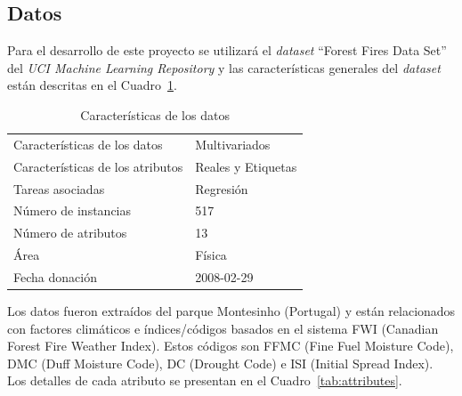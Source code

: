 \documentclass[spanish]{article}
\begin{document}
	\subsection{Datos}
    
  	Para el desarrollo de este proyecto se utilizará el \emph{dataset} ``Forest Fires Data Set'' del 
    \emph{UCI Machine Learning Repository} \cite{cortez} y las características generales del \emph{dataset} 
    están descritas en el Cuadro~\ref{tab:features}.
    
    \clearpage
    
    \begin{table}[!ht]
    	\centering            
      \caption{Características de los datos}
    	\begin{tabular}{ll} 
      	\hline
      	Características de los datos & Multivariados \\              			    				
        Características de los atributos & Reales y Etiquetas \\
        Tareas asociadas & Regresión \\
        Número de instancias & 517 \\
        Número de atributos & 13 \\
        Área & Física \\
        Fecha donación & 2008-02-29 \\
        \hline
    	\end{tabular}            
      \label{tab:features}
    \end{table}
      
    Los datos fueron extraídos del parque Montesinho (Portugal) y están relacionados con factores climáticos 
    e índices/códigos basados en el sistema FWI (Canadian Forest Fire Weather Index). Estos códigos son
    FFMC (Fine Fuel Moisture Code), DMC (Duff Moisture Code), DC (Drought Code) e ISI (Initial Spread Index).
    Los detalles de cada atributo se presentan en el Cuadro~\ref{tab:attributes}.
    
\end{document}
